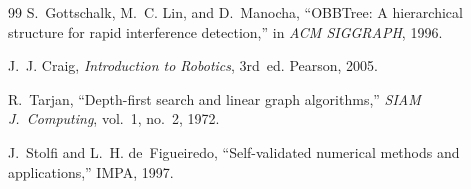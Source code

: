 \documentclass[11pt,a4paper]{article}
\begin{document}
\begin{thebibliography}{99}
S.~Gottschalk, M.~C. Lin, and D.~Manocha, ``OBBTree: A hierarchical structure for rapid interference detection,'' in \emph{ACM SIGGRAPH}, 1996.

J.~J. Craig, \emph{Introduction to Robotics}, 3rd~ed. Pearson, 2005.

R.~Tarjan, ``Depth-first search and linear graph algorithms,'' \emph{SIAM J.\ Computing}, vol.~1, no.~2, 1972.

J.~Stolfi and L.~H. de~Figueiredo, ``Self-validated numerical methods and applications,'' IMPA, 1997.

\end{thebibliography}
\end{document}
